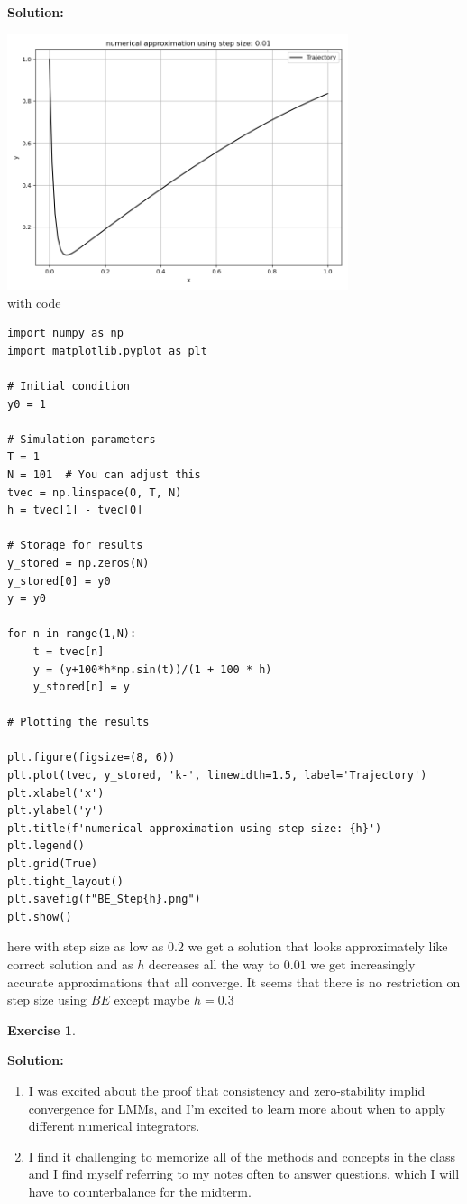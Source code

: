 \documentclass[a4paper,12pt]{scrartcl} %
\newenvironment{solution}
  {\par\color{answercolor}\textbf{Solution:}\ }
  {\par}
\newcounter{customcounter}
\theoremstyle{darktheorem}
\newtheorem{exercise}[customcounter]{Exercise}
\begin{document}
\begin{solution}
\begin{enumerate}
\begin{enumerate}
            \includegraphics[width = 10cm]{BE_STEP0.01.png}\\
            with code
            \begin{lstlisting}
import numpy as np
import matplotlib.pyplot as plt

# Initial condition
y0 = 1

# Simulation parameters
T = 1
N = 101  # You can adjust this
tvec = np.linspace(0, T, N)
h = tvec[1] - tvec[0]

# Storage for results
y_stored = np.zeros(N)
y_stored[0] = y0
y = y0

for n in range(1,N):
    t = tvec[n]
    y = (y+100*h*np.sin(t))/(1 + 100 * h)
    y_stored[n] = y

# Plotting the results

plt.figure(figsize=(8, 6))
plt.plot(tvec, y_stored, 'k-', linewidth=1.5, label='Trajectory')
plt.xlabel('x')
plt.ylabel('y')
plt.title(f'numerical approximation using step size: {h}')
plt.legend()
plt.grid(True)
plt.tight_layout()
plt.savefig(f"BE_Step{h}.png")
plt.show()
            \end{lstlisting}
            here with step size as low as $0.2$ we get a solution that looks approximately like correct solution
            and as $h$ decreases all the way to $0.01$ we get increasingly accurate approximations that all converge.
            It seems that there is no restriction on step size using $BE$ except maybe  $h = 0.3$
    \end{enumerate}
\end{enumerate}        
\end{solution}
\begin{exercise}
\end{exercise}
\begin{solution}
    \begin{enumerate}
        \item  I was excited about the proof that consistency and zero-stability implid convergence for LMMs,
            and I'm excited to learn more about when to apply different numerical integrators.
        \item I find it challenging to memorize all of the methods and concepts in the class and I find myself
            referring to my notes often to answer questions, which I will have to counterbalance for the midterm.
    \end{enumerate}
\end{solution}
\end{document}
